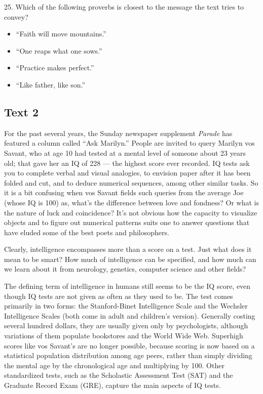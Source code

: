 \documentclass[UTF8,11pt]{ctexart}
\begin{document}
25. Which of the following proverbs is closest to the message the text tries to convey?


\begin{itemize}[leftmargin=2em,itemsep=.2em,topsep=.4em]\item[A.] “Faith will move mountains.”
\item[B.] “One reaps what one sows.”
\item[C.] “Practice makes perfect.”
\item[D.] “Like father, like son.”
\end{itemize}

\subsection*{\textbf{Text 2}}


For the past several years, the Sunday newspaper supplement \textit{Parade} has featured a column called “Ask Marilyn.” People are invited to query Marilyn vos Savant, who at age 10 had tested at a mental level of someone about 23 years old; that gave her an IQ of 228 — the highest score ever recorded. IQ tests ask you to complete verbal and visual analogies, to envision paper after it has been folded and cut, and to deduce numerical sequences, among other similar tasks. So it is a bit confusing when vos Savant fields such queries from the average Joe (whose IQ is 100) as, what’s the difference between love and fondness? Or what is the nature of luck and coincidence? It’s not obvious how the capacity to visualize objects and to figure out numerical patterns suits one to answer questions that have eluded some of the best poets and philosophers.


Clearly, intelligence encompasses more than a score on a test. Just what does it mean to be smart? How much of intelligence can be specified, and how much can we learn about it from neurology, genetics, computer science and other fields?


The defining term of intelligence in humans still seems to be the IQ score, even though IQ tests are not given as often as they used to be. The test comes primarily in two forms: the Stanford-Binet Intelligence Scale and the Wechsler Intelligence Scales (both come in adult and children’s version). Generally costing several hundred dollars, they are usually given only by psychologists, although variations of them populate bookstores and the World Wide Web. Superhigh scores like vos Savant’s are no longer possible, because scoring is now based on a statistical population distribution among age peers, rather than simply dividing the mental age by the chronological age and multiplying by 100. Other standardized tests, such as the Scholastic Assessment Test (SAT) and the Graduate Record Exam (GRE), capture the main aspects of IQ tests.
\end{document}
